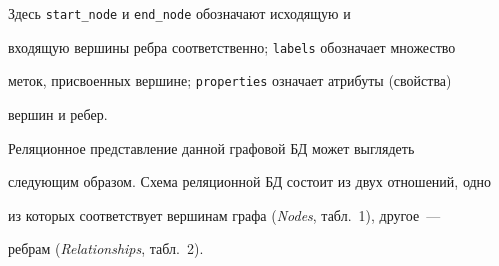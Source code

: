       Здесь \verb"start_node" и \verb"end_node" обозначают исходящую и

входящую вершины ребра соответственно; \verb"labels" обозначает множество

меток, присвоенных вершине; \verb"properties" означает атрибуты (свойства)

вершин и ребер.



      Реляционное представление данной графовой БД может выглядеть

следующим образом. Схема реляционной БД состоит из двух отношений, одно

из которых соответствует вершинам графа (\textit{Nodes}, табл.~1), другое~---

ребрам (\textit{Relationships}, табл.~2).







